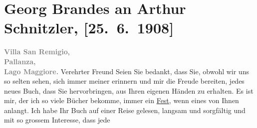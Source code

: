 

         
         \renewcommand{\erwaehntePersonen}{Personen: Georg Brandes}
         \renewcommand{\erwaehnteOrte}{Orte: Pallanza, Seis am Schlern, Villa San Remigio, Wien, Österreich}
         \renewcommand{\erwaehnteWerke}{Werke: Der Weg ins Freie. Roman}
               \section[Georg Brandes an Arthur Schnitzler, {[}25. 6. 1908{]}]{ Georg Brandes an Arthur Schnitzler, {[}25. 6. 1908{]}}\nopagebreak{}\rehead{ }\begin{ledgroupsized}[t]{13cm}\normalsize\beginnumbering \toendnotes[C]{\smallbreak\pagebreak[2]} 
\toendnotes[C]{\smallbreak}\pstart
           \noindent{}{\pb}\textcolor{gray}{\textbf{Villa San Remigio}}, {\\}\textcolor{gray}{\textbf{Pallanza,}}{\\}\textcolor{gray}{\textbf{Lago Maggiore.}}\pend
           \pstart{}Verehrter Freund\pend\pstart
           Seien Sie bedankt, dass Sie, obwohl wir uns so selten sehen, sich immer meiner
               erinnern und mir die Freude bereiten, jedes neues Buch, dass Sie hervorbringen, aus
               Ihren eigenen Händen zu erhalten. Es ist mir, der ich so viele Bücher bekomme, immer
               ein \uline{Fest}, wenn eines von Ihnen anlangt.\pend
           \pstart
           Ich habe Ihr Buch auf einer
               Reise gelesen, langsam und sorgfältig und mit so grossem Interesse, dass jede

\end{ledgroupsized}
